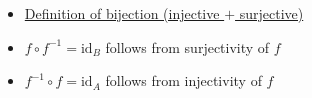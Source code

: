 \begin{remark*}[Dependencies]
\begin{itemize}
  \item \hyperref[def:alg-bijective]{Definition of bijection (injective $+$ surjective)}
  \item $f \circ f^{-1} = \mathrm{id}_B$ follows from surjectivity of $f$
  \item $f^{-1} \circ f = \mathrm{id}_A$ follows from injectivity of $f$
\end{itemize}
\end{remark*}
